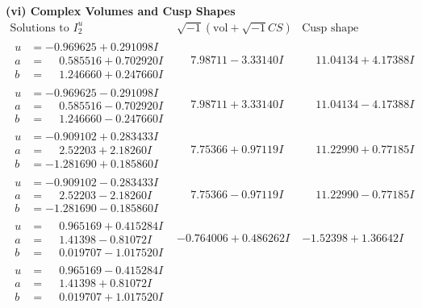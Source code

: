 \documentclass[1p]{elsarticle_modified}
\theoremstyle{definition}
\newcommand{\I}{\sqrt{-1}}
\begin{document}
\newpage\flushleft \textbf{(vi) Complex Volumes and Cusp Shapes}
$$\begin{array}{c|c|c}  
\text{Solutions to }I^u_{2}& \I (\text{vol} + \sqrt{-1}CS) & \text{Cusp shape}\\
 \hline 
\begin{aligned}
u &= -0.969625 + 0.291098 I \\
a &= \phantom{-}0.585516 + 0.702920 I \\
b &= \phantom{-}1.246660 + 0.247660 I\end{aligned}
 & \phantom{-}7.98711 - 3.33140 I & \phantom{-}11.04134 + 4.17388 I \\ \hline\begin{aligned}
u &= -0.969625 - 0.291098 I \\
a &= \phantom{-}0.585516 - 0.702920 I \\
b &= \phantom{-}1.246660 - 0.247660 I\end{aligned}
 & \phantom{-}7.98711 + 3.33140 I & \phantom{-}11.04134 - 4.17388 I \\ \hline\begin{aligned}
u &= -0.909102 + 0.283433 I \\
a &= \phantom{-}2.52203 + 2.18260 I \\
b &= -1.281690 + 0.185860 I\end{aligned}
 & \phantom{-}7.75366 + 0.97119 I & \phantom{-}11.22990 + 0.77185 I \\ \hline\begin{aligned}
u &= -0.909102 - 0.283433 I \\
a &= \phantom{-}2.52203 - 2.18260 I \\
b &= -1.281690 - 0.185860 I\end{aligned}
 & \phantom{-}7.75366 - 0.97119 I & \phantom{-}11.22990 - 0.77185 I \\ \hline\begin{aligned}
u &= \phantom{-}0.965169 + 0.415284 I \\
a &= \phantom{-}1.41398 - 0.81072 I \\
b &= \phantom{-}0.019707 - 1.017520 I\end{aligned}
 & -0.764006 + 0.486262 I & -1.52398 + 1.36642 I \\ \hline\begin{aligned}
u &= \phantom{-}0.965169 - 0.415284 I \\
a &= \phantom{-}1.41398 + 0.81072 I \\
b &= \phantom{-}0.019707 + 1.017520 I\end{aligned}

\end{array}$$
\end{document}

